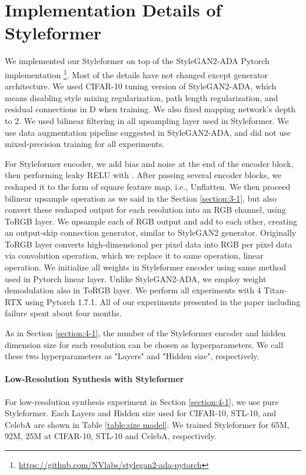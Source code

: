\documentclass[10pt,twocolumn,letterpaper]{article}
\begin{document}
{\small


}

\newpage


\appendix



\section{Implementation Details of Styleformer}
\label{app:A}
We implemented our Styleformer on top of the StyleGAN2-ADA Pytorch implementation \footnote{\url{https://github.com/NVlabs/stylegan2-ada-pytorch}}. 
Most of the details have not changed except generator architecture. We used CIFAR-10 tuning version of StyleGAN2-ADA, which means disabling style mixing regularization, path length regularization, and residual connections in D when training. We also fixed mapping network's depth to 2. We used bilinear filtering in all upsampling layer used in Styleformer. We use data augmentation pipeline suggested in StyleGAN2-ADA, and did not use mixed-precision training for all experiments.

For Styleformer encoder, we add bias and noise at the end of the encoder block, then performing leaky RELU with . After passing several encoder blocks, we reshaped it to the form of square feature map, i.e., Unflatten. We then proceed bilinear upsample operation as we said in the Section \ref{section:3-1}, but also convert these reshaped output for each resolution into an RGB channel, using ToRGB layer. We upsample each of RGB output and add to each other, creating an output-skip connection generator, similar to StyleGAN2 generator. Originally ToRGB layer converts high-dimensional per pixel data into RGB per pixel data via  convolution operation, which we replace it to same operation, linear operation. We initialize all weights in Styleformer encoder using same method used in Pytorch linear layer. Unlike StyleGAN2-ADA, we employ weight demodulation also in ToRGB layer. We perform all experiments with 4 Titan-RTX using Pytorch 1.7.1. All of our experiments presented in the paper including failure spent about four months.

As in Section \ref{section:4-1}, the number of the Styleformer encoder and hidden dimension size for each resolution can be chosen as hyperparameters. We call these two hyperparameters as "Layers" and "Hidden size", respectively. 

\paragraph{Low-Resolution Synthesis with Styleformer}
For low-resolution synthesis experiment in Section \ref{section:4-1}, we use pure Styleformer. Each Layers and Hidden size used for CIFAR-10, STL-10, and CelebA are shown in Table \ref{table:size model}. We trained Styleformer for 65M, 92M, 25M at CIFAR-10, STL-10 and CelebA, respectively.
\end{document}
